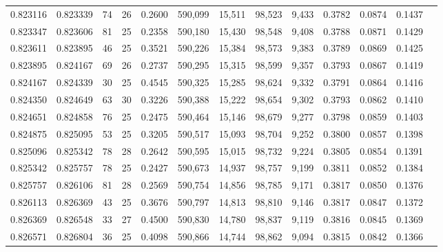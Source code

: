\begin{tabular}{rrrrrrrrrrrrr}
0.823116 & 0.823339 &    74 &  26 &                                     0.2600 & 590,099 &  15,511 &  98,523 &   9,433 & 0.3782 & 0.0874 & 0.1437 \\
0.823347 & 0.823606 &    81 &  25 &                                     0.2358 & 590,180 &  15,430 &  98,548 &   9,408 & 0.3788 & 0.0871 & 0.1429 \\
0.823611 & 0.823895 &    46 &  25 &                                     0.3521 & 590,226 &  15,384 &  98,573 &   9,383 & 0.3789 & 0.0869 & 0.1425 \\
0.823895 & 0.824167 &    69 &  26 &                                     0.2737 & 590,295 &  15,315 &  98,599 &   9,357 & 0.3793 & 0.0867 & 0.1419 \\
0.824167 & 0.824339 &    30 &  25 &                                     0.4545 & 590,325 &  15,285 &  98,624 &   9,332 & 0.3791 & 0.0864 & 0.1416 \\
0.824350 & 0.824649 &    63 &  30 &                                     0.3226 & 590,388 &  15,222 &  98,654 &   9,302 & 0.3793 & 0.0862 & 0.1410 \\
0.824651 & 0.824858 &    76 &  25 &                                     0.2475 & 590,464 &  15,146 &  98,679 &   9,277 & 0.3798 & 0.0859 & 0.1403 \\
0.824875 & 0.825095 &    53 &  25 &                                     0.3205 & 590,517 &  15,093 &  98,704 &   9,252 & 0.3800 & 0.0857 & 0.1398 \\
0.825096 & 0.825342 &    78 &  28 &                                     0.2642 & 590,595 &  15,015 &  98,732 &   9,224 & 0.3805 & 0.0854 & 0.1391 \\
0.825342 & 0.825757 &    78 &  25 &                                     0.2427 & 590,673 &  14,937 &  98,757 &   9,199 & 0.3811 & 0.0852 & 0.1384 \\
0.825757 & 0.826106 &    81 &  28 &                                     0.2569 & 590,754 &  14,856 &  98,785 &   9,171 & 0.3817 & 0.0850 & 0.1376 \\
0.826113 & 0.826369 &    43 &  25 &                                     0.3676 & 590,797 &  14,813 &  98,810 &   9,146 & 0.3817 & 0.0847 & 0.1372 \\
0.826369 & 0.826548 &    33 &  27 &                                     0.4500 & 590,830 &  14,780 &  98,837 &   9,119 & 0.3816 & 0.0845 & 0.1369 \\
0.826571 & 0.826804 &    36 &  25 &                                     0.4098 & 590,866 &  14,744 &  98,862 &   9,094 & 0.3815 & 0.0842 & 0.1366 \\

\end{tabular}
